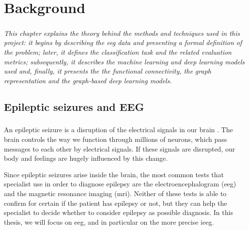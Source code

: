 
\chapter{Background} \label{chap: background}

\paragraph{} \textit{This chapter explains the theory behind the methods and techniques used in this project: it begins by describing the \acs{eeg} data and presenting a formal definition of the problem; later, it defines the classification task and the related evaluation metrics; subsequently, it describes the machine learning and deep learning models used and, finally, it presents the the functional connectivity, the graph representation and the graph-based deep learning models.}


\section{Epileptic seizures and EEG} \label{sec: epileptic_seizures_and_eeg}
\paragraph{} An epileptic seizure is a disruption of the electrical signals in our brain \cite{EpilepsySociety:aboutepilepsy}. The brain controls the way we function through millions of neurons, which pass messages to each other by electrical signals. If these signals are disrupted, our body and feelings are hugely influenced by this change.

Since epileptic seizures arise inside the brain, the most common tests that specialist use in order to diagnose epilepsy are the electroencephalogram (\acs{eeg}) and the magnetic resonance imaging (\acs{mri}). Neither of these tests is able to confirm for certain if the patient has epilepsy or not, but they can help the specialist to decide whether to consider epilepsy as possible diagnosis. In this thesis, we will focus on \acs{eeg}, and in particular on the more precise \acs{ieeg}.

